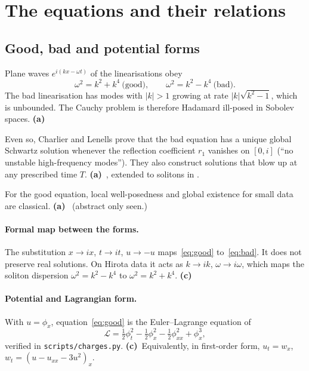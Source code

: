 \documentclass[11pt,a4paper]{article}
\newcommand{\La}{\textsf{\textbf{(a)}}}
\newcommand{\Lc}{\textsf{\textbf{(c)}}}
\newcommand{\script}[1]{\texttt{scripts/#1}}
\theoremstyle{remark}
\begin{document}
\section{The equations and their relations}\label{sec:equations}

\subsection{Good, bad and potential forms}\label{sec:goodbad}

Plane waves $e^{i(kx-\omega t)}$ of the linearisations obey
\[
\omega^2=k^2+k^4 \ \text{(good)},\qquad \omega^2=k^2-k^4\ \text{(bad)} .
\]
The bad linearisation has modes with $|k|>1$ growing at rate $|k|\sqrt{k^2-1}$, which is unbounded. The Cauchy problem is therefore Hadamard ill-posed in Sobolev spaces. \La~\cite{BD,CL-WW}

Even so, Charlier and Lenells prove that the bad equation has a unique global Schwartz solution whenever the reflection coefficient $r_1$ vanishes on $[0,i]$ (``no unstable high-frequency modes''). They also construct solutions that blow up at any prescribed time $T$. \La~\cite[Thms 2.8--2.12]{CL-WW}, extended to solitons in \cite[Thms 2.6--2.11]{CL-SOL}.

For the good equation, local well-posedness and global existence for small data are classical. \La~\cite{BonaSachs} (abstract only seen.)

\paragraph{Formal map between the forms.} The substitution $x\to ix$, $t\to it$, $u\to-u$ maps~\eqref{eq:good} to~\eqref{eq:bad}. It does not preserve real solutions. On Hirota data it acts as $k\to ik$, $\omega\to i\omega$, which maps the soliton dispersion $\omega^2=k^2-k^4$ to $\omega^2=k^2+k^4$. \Lc

\paragraph{Potential and Lagrangian form.} With $u=\phi_x$, equation~\eqref{eq:good} is the Euler--Lagrange equation of
\begin{equation}\label{eq:Lag}
\mathcal L=\tfrac12\phi_t^2-\tfrac12\phi_x^2-\tfrac12\phi_{xx}^2+\phi_x^3 ,
\end{equation}
verified in \script{charges.py}. \Lc\ Equivalently, in first-order form, $u_t=w_x$, $w_t=(u-u_{xx}-3u^2)_x$.
\end{document}

